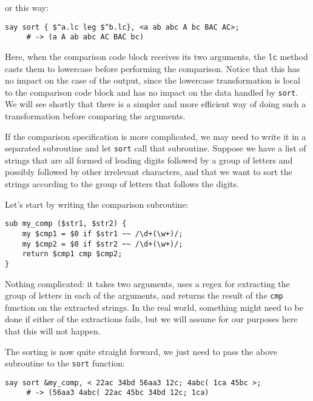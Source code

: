 or this way:
\begin{verbatim}
say sort { $^a.lc leg $^b.lc}, <a ab abc A bc BAC AC>;
     # -> (a A ab abc AC BAC bc)
\end{verbatim}

Here, when the comparison code block receives its two 
arguments, the {\tt lc} method casts them to lowercase 
before performing the comparison. Notice that this has 
no impact on the case of the output, since the lowercase 
transformation is local to the comparison code block and 
has no impact on the data handled by {\tt sort}. We will 
see shortly that there is a simpler and more efficient 
way of doing such a transformation before comparing the 
arguments.

If the comparison specification is more complicated, we 
may need to write it in a separated subroutine and let 
{\tt sort} call that subroutine. Suppose we have a list 
of strings that are all formed of leading digits 
followed by a group of letters and possibly followed by other 
irrelevant characters, and that we want to sort the 
strings according to the group of letters that follows 
the digits.

Let's start by writing the comparison subroutine:


\begin{verbatim}
sub my_comp ($str1, $str2) {
    my $cmp1 = $0 if $str1 ~~ /\d+(\w+)/; 
    my $cmp2 = $0 if $str2 ~~ /\d+(\w+)/; 
    return $cmp1 cmp $cmp2;
}
\end{verbatim}

Nothing complicated: it takes two arguments, uses a regex 
for extracting the group of letters in each of the 
arguments, and returns the result of the {\tt cmp} 
function on the extracted strings. In the real world, something 
might need to be done if either of the extractions fails, but 
we will assume for our purposes here that this will not happen.

The sorting is now quite straight forward, we just need to 
pass the above subroutine to the {\tt sort} function:

\begin{verbatim}
say sort &my_comp, < 22ac 34bd 56aa3 12c; 4abc( 1ca 45bc >;
     # -> (56aa3 4abc( 22ac 45bc 34bd 12c; 1ca)
\end{verbatim}

